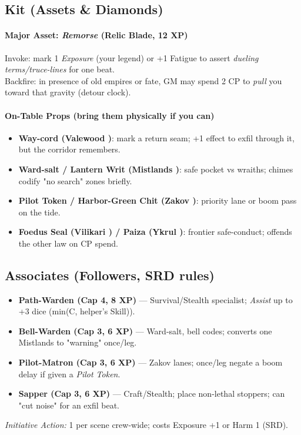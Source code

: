 \subsection{Kit (Assets \& Diamonds)}
\paragraph{Major Asset: \emph{Remorse} (Relic Blade, 12 XP)}
Invoke: mark 1 \emph{Exposure} (your legend) or +1 Fatigue to assert \emph{dueling terms/truce-lines} for one beat. \\
Backfire: in presence of old empires or fate, GM may spend 2 CP to \emph{pull} you toward that gravity (detour clock).

\paragraph{On-Table Props (bring them physically if you can)}
\begin{itemize}
  \item \textbf{Way-cord (Valewood \SuitDiamond{})}: mark a return seam; +1 effect to exfil through it, but the corridor remembers.
  \item \textbf{Ward-salt / Lantern Writ (Mistlands \SuitDiamond{})}: safe pocket vs wraiths; chimes codify "no search" zones briefly.
  \item \textbf{Pilot Token / Harbor-Green Chit (Zakov \SuitDiamond{})}: priority lane or boom pass on the tide.
  \item \textbf{Foedus Seal (Vilikari \SuitDiamond{}) / Paiza (Ykrul \SuitDiamond{})}: frontier safe-conduct; offends the other law on CP spend.
\end{itemize}

\subsection{Associates (Followers, SRD rules)}
\begin{itemize}
  \item \textbf{Path-Warden (Cap 4, 8 XP)} — Survival/Stealth specialist; \emph{Assist} up to +3 dice (min(C, helper's Skill)).
  \item \textbf{Bell-Warden (Cap 3, 6 XP)} — Ward-salt, bell codes; converts one Mistlands \SuitClub{} to "warning" once/leg.
  \item \textbf{Pilot-Matron (Cap 3, 6 XP)} — Zakov lanes; once/leg negate a boom delay if given a \emph{Pilot Token}.
  \item \textbf{Sapper (Cap 3, 6 XP)} — Craft/Stealth; place non-lethal stoppers; can "cut noise" for an exfil beat.
\end{itemize}
\emph{Initiative Action:} 1 per scene crew-wide; costs Exposure +1 or Harm 1 (SRD).

